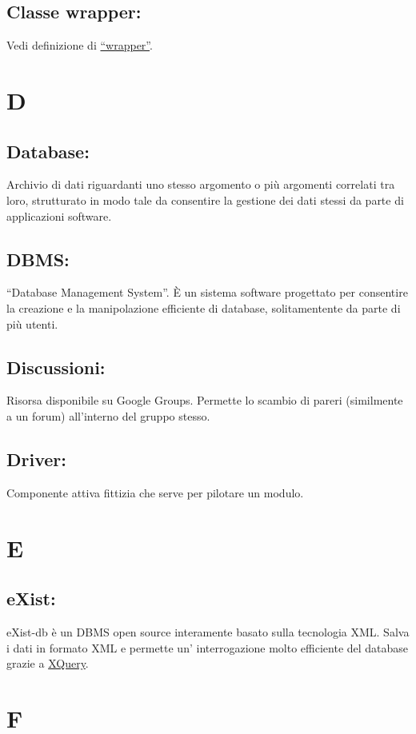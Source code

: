 \section{Classe wrapper:}
Vedi definizione di \hyperlink{wrapper}{``wrapper''}.

\chapter{D}
\section{Database:}
Archivio di dati riguardanti uno stesso argomento o pi\`u argomenti correlati tra loro, strutturato in modo tale da consentire la gestione dei dati stessi da parte di applicazioni software.
\section{DBMS:}
``Database Management System''. \`E un sistema software progettato per consentire la creazione e la manipolazione efficiente di database, solitamentente da parte di pi\`u utenti.
\section{Discussioni:}
Risorsa disponibile su Google Groups. Permette lo scambio di pareri (similmente a un forum) all'interno del gruppo stesso.
\section{Driver:}
Componente attiva fittizia che serve per pilotare un modulo.

\chapter{E}
\section{eXist:}
eXist-db \`e un DBMS open source interamente basato sulla tecnologia XML. Salva i dati in formato XML e permette un' interrogazione molto efficiente del database grazie a \hyperlink{XQuery}{XQuery}.

\chapter{F}
\hypertarget{FLWOR}{}
